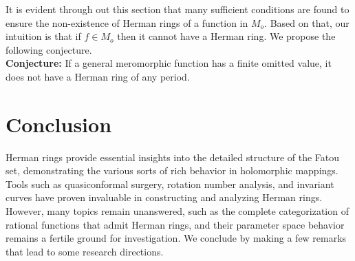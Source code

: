 \documentclass[12pt]{article}
\begin{document}
It is evident through out this section that many sufficient conditions are found to ensure the non-existence of Herman rings of a function in $M_o$. Based on that, our intuition is that if $f\in M_o$ then it cannot have a Herman ring. We propose the following conjecture.\\
\textbf{Conjecture:} If a general meromorphic function has a finite omitted value, it does not have a Herman ring of any period.


\section{Conclusion}\label{con}
 Herman rings provide essential insights into the detailed structure of the Fatou set, demonstrating the various sorts of rich behavior in holomorphic mappings. Tools such as quasiconformal surgery, rotation number analysis, and invariant curves have proven invaluable in constructing and analyzing Herman rings. However, many topics remain unanswered, such as the complete categorization of rational functions that admit Herman rings, and their parameter space behavior remains a fertile ground for investigation. We conclude by making a few remarks that lead to some research directions.
 
\end{document}
